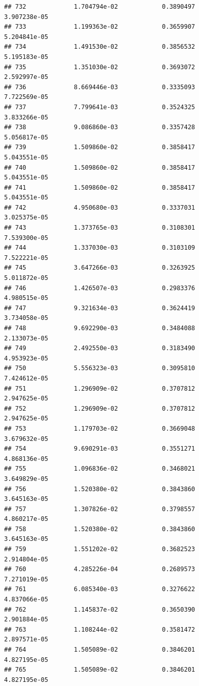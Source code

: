 \documentclass[
]{article}
\begin{document}
\begin{verbatim}
## 732             1.704794e-02            0.3890497            3.907238e-05
## 733             1.199363e-02            0.3659907            5.204841e-05
## 734             1.491530e-02            0.3856532            5.195183e-05
## 735             1.351030e-02            0.3693072            2.592997e-05
## 736             8.669446e-03            0.3335093            7.722569e-05
## 737             7.799641e-03            0.3524325            3.833266e-05
## 738             9.086860e-03            0.3357428            5.056817e-05
## 739             1.509860e-02            0.3858417            5.043551e-05
## 740             1.509860e-02            0.3858417            5.043551e-05
## 741             1.509860e-02            0.3858417            5.043551e-05
## 742             4.950680e-03            0.3337031            3.025375e-05
## 743             1.373765e-03            0.3108301            7.539300e-05
## 744             1.337030e-03            0.3103109            7.522221e-05
## 745             3.647266e-03            0.3263925            5.011872e-05
## 746             1.426507e-03            0.2983376            4.980515e-05
## 747             9.321634e-03            0.3624419            3.734058e-05
## 748             9.692290e-03            0.3484088            2.133073e-05
## 749             2.492550e-03            0.3183490            4.953923e-05
## 750             5.556323e-03            0.3095810            7.424612e-05
## 751             1.296909e-02            0.3707812            2.947625e-05
## 752             1.296909e-02            0.3707812            2.947625e-05
## 753             1.179703e-02            0.3669048            3.679632e-05
## 754             9.690291e-03            0.3551271            4.868136e-05
## 755             1.096836e-02            0.3468021            3.649829e-05
## 756             1.520380e-02            0.3843860            3.645163e-05
## 757             1.307826e-02            0.3798557            4.860217e-05
## 758             1.520380e-02            0.3843860            3.645163e-05
## 759             1.551202e-02            0.3682523            2.914804e-05
## 760             4.285226e-04            0.2689573            7.271019e-05
## 761             6.085340e-03            0.3276622            4.837066e-05
## 762             1.145837e-02            0.3650390            2.901884e-05
## 763             1.108244e-02            0.3581472            2.897571e-05
## 764             1.505089e-02            0.3846201            4.827195e-05
## 765             1.505089e-02            0.3846201            4.827195e-05

\end{verbatim}
\end{document}
